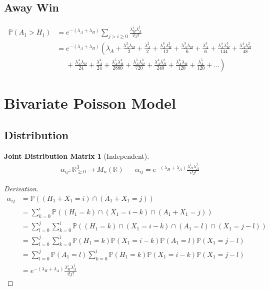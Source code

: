 \documentclass[a4paper,11pt,oneside]{book}
\theoremstyle{plain}
\newtheorem*{jdm}{Joint Distribution Matrix}
\theoremstyle{definition}
\begin{document}
\subsection{Away Win}
\begin{align*}
\mathbb{P}(A_1>H_1)&=e^{-(\lambda_A+\lambda_H)}\sum_{j>i\ge 0}\frac{\lambda_H^i\lambda_A^j}{i!j!}\\
&=e^{-(\lambda_A+\lambda_H)}\left(\lambda_A+\frac{\lambda_A^2\lambda_H}{2}+\frac{\lambda_A^2}{2}+\frac{\lambda_A^3\lambda_H^2}{12}+\frac{\lambda_A^3\lambda_H}{6}+\frac{\lambda_A^3}{6}+\frac{\lambda_A^4\lambda_H^3}{144}+\frac{\lambda_A^4\lambda_H^2}{48}\right.\\
&\left.\phantom{=}+\frac{\lambda_A^4\lambda_H}{24}+\frac{\lambda_A^4}{24}+\frac{\lambda_A^5\lambda_H^4}{2880}+\frac{\lambda_A^5\lambda_H^3}{720}+\frac{\lambda_A^4\lambda_H^2}{240}+\frac{\lambda_A^4\lambda_H}{120}+\frac{\lambda_A^5}{120}+\ldots\right)
\end{align*}
\section{Bivariate Poisson Model}
\subsection{Distribution}
\begin{jdm}[Independent]
\begin{align*}
\alpha_{ij}: \mathbb{R}^3_{\ge 0} \rightarrow M_n(\mathbb{R}) && \alpha_{ij}=e^{-(\lambda_H+\lambda_A)}\frac{\lambda_H^i\lambda_A^j}{i!j!}
\end{align*}
\end{jdm}
\begin{proof}[Derivation]
\begin{align*}
\alpha_{ij}&=\mathbb{P}((H_1+X_1=i)\cap (A_1+X_1=j))\\
&=\sum_{k=0}^i \mathbb{P}((H_1=k)\cap (X_1=i-k)\cap (A_1+X_1=j))\\
&=\sum_{l=0}^j\sum_{k=0}^i \mathbb{P}((H_1=k)\cap (X_1=i-k)\cap (A_1=l)\cap (X_1=j-l))\\
&=\sum_{l=0}^j\sum_{k=0}^i \mathbb{P}(H_1=k)\mathbb{P}(X_1=i-k)\mathbb{P} (A_1=l)\mathbb{P} (X_1=j-l)\\
&=\sum_{l=0}^j\mathbb{P} (A_1=l)\sum_{k=0}^i \mathbb{P}(H_1=k)\mathbb{P}(X_1=i-k)\mathbb{P} (X_1=j-l)\\
&=e^{-(\lambda_H+\lambda_A)}\frac{\lambda_H^i\lambda_A^j}{i!j!}
\end{align*}
\end{proof}
\end{document}
